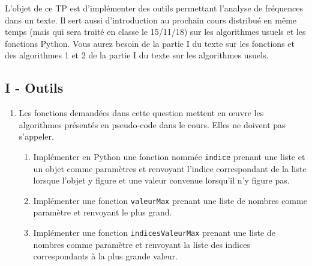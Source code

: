 L'objet de ce TP est d'implémenter des outils permettant l'analyse de fréquences dans un texte.\newline
Il sert aussi d'introduction au prochain cours distribué en même temps (mais qui sera traité en classe le 15/11/18) sur les algorithmes usuels et les fonctions Python. Vous aurez besoin de la partie I du texte sur les fonctions et des algorithmes 1 et 2 de la partie I du texte sur les algorithmes usuels. 

\subsection*{I - Outils}
\begin{enumerate}
  \item Les fonctions demandées dans cette question mettent en \oe{}uvre les algorithmes présentés en pseudo-code dans le cours. Elles ne doivent pas s'appeler.
\begin{enumerate}
  \item Implémenter en Python une fonction nommée \verb|indice| prenant une liste et un objet comme paramètres et renvoyant l'indice correspondant de la liste lorsque l'objet y figure et une valeur convenue lorsqu'il n'y figure pas.
  \item Implémenter une fonction \texttt{valeurMax} prenant une liste de nombres comme paramètre et renvoyant le plus grand.
  \item Implémenter une fonction \texttt{indicesValeurMax} prenant une liste de nombres comme paramètre et renvoyant la liste des indices correspondants à la plus grande valeur.   
\end{enumerate}
   

\end{enumerate}
